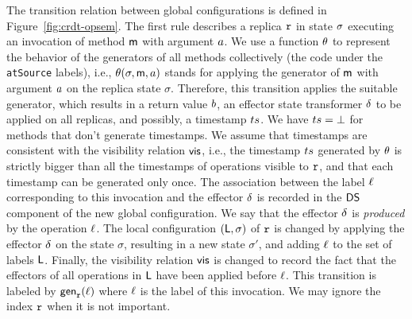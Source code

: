 The transition relation between global configurations is defined in
Figure~\ref{fig:crdt-opsem}.
The first rule describes a replica $\mathtt{r}$ in state $\sigma$
executing an invocation of method $\mathsf{m}$ with argument $a$.
We use a function $\theta$ to represent the behavior of the generators of all methods collectively (the code under the \lstinline|atSource| labels),
i.e., $\theta(\sigma,\mathsf{m},a)$ stands for applying the generator of $\mathsf{m}$ with argument $a$ on the
replica state $\sigma$. Therefore, this transition applies the suitable generator,
which results in a
return value $b$, an effector state transformer $\delta$
to be applied on all replicas, and possibly, a timestamp $ts$.
We have $ts=\bot$ for methods that don't generate
timestamps. 
We assume that timestamps are consistent with the visibility relation
$\mathsf{vis}$, i.e., the timestamp $ts$ generated by $\theta$ is strictly bigger than
all the timestamps of operations visible to $\mathtt{r}$, and that each timestamp can be generated only once.
The association between the label $\ell$ corresponding to this
invocation and the effector $\delta$ is recorded in the
$\mathsf{DS}$ component of the new global configuration.
We say that the effector $\delta$ is \emph{produced} by the operation $\ell$.
The local configuration $(\mathsf{L},\sigma)$ of $\mathtt{r}$ is changed by
applying the effector $\delta$ on the state $\sigma$, resulting
in a new state $\sigma'$, and adding $\ell$ to the set of labels
$\mathsf{L}$.
Finally, the visibility relation $\mathsf{vis}$ is changed to record the
fact that the effectors of all operations in $\mathsf{L}$ have been
applied before $\ell$. This transition is labeled by $\mathsf{gen}_{\mathtt{r}}(\ell)$ where
$\ell$ is the label of this invocation. We may ignore the index $\mathtt{r}$ when it is not important.
%



